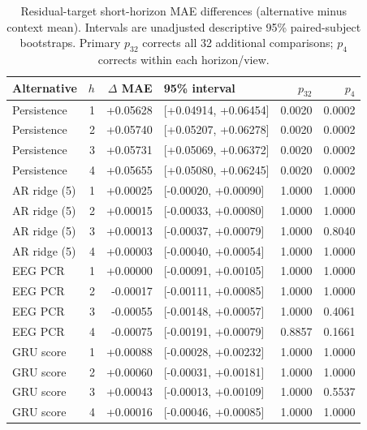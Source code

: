 \begin{table}[!ht]
\centering
\small
\setlength{\tabcolsep}{5pt}
\renewcommand{\arraystretch}{1.1}
\caption{Residual-target short-horizon MAE differences (alternative minus context mean). Intervals are unadjusted descriptive 95\% paired-subject bootstraps. Primary $p_{32}$ corrects all 32 additional comparisons; $p_4$ corrects within each horizon/view.}
\label{tab:supp_short_pairs_residual}
\begin{tabular}{lrrlrr}
\toprule
Alternative & $h$ & $\Delta$ MAE & 95\% interval & $p_{32}$ & $p_4$ \\
\midrule
Persistence & 1 & +0.05628 & [+0.04914, +0.06454] & 0.0020 & 0.0002 \\
Persistence & 2 & +0.05740 & [+0.05207, +0.06278] & 0.0020 & 0.0002 \\
Persistence & 3 & +0.05731 & [+0.05069, +0.06372] & 0.0020 & 0.0002 \\
Persistence & 4 & +0.05655 & [+0.05080, +0.06245] & 0.0020 & 0.0002 \\
AR ridge (5) & 1 & +0.00025 & [-0.00020, +0.00090] & 1.0000 & 1.0000 \\
AR ridge (5) & 2 & +0.00015 & [-0.00033, +0.00080] & 1.0000 & 1.0000 \\
AR ridge (5) & 3 & +0.00013 & [-0.00037, +0.00079] & 1.0000 & 0.8040 \\
AR ridge (5) & 4 & +0.00003 & [-0.00040, +0.00054] & 1.0000 & 1.0000 \\
EEG PCR & 1 & +0.00000 & [-0.00091, +0.00105] & 1.0000 & 1.0000 \\
EEG PCR & 2 & -0.00017 & [-0.00111, +0.00085] & 1.0000 & 1.0000 \\
EEG PCR & 3 & -0.00055 & [-0.00148, +0.00057] & 1.0000 & 0.4061 \\
EEG PCR & 4 & -0.00075 & [-0.00191, +0.00079] & 0.8857 & 0.1661 \\
GRU score & 1 & +0.00088 & [-0.00028, +0.00232] & 1.0000 & 1.0000 \\
GRU score & 2 & +0.00060 & [-0.00031, +0.00181] & 1.0000 & 1.0000 \\
GRU score & 3 & +0.00043 & [-0.00013, +0.00109] & 1.0000 & 0.5537 \\
GRU score & 4 & +0.00016 & [-0.00046, +0.00085] & 1.0000 & 1.0000 \\
\bottomrule
\end{tabular}
\end{table}
